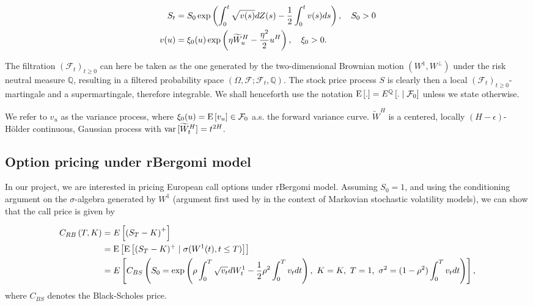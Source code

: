 \begin{align}\label{eq:rBergomi_model}
	S_t&= S_0  \operatorname{exp}\left( \int_{0}^{t} \sqrt{v(s)} dZ(s)- \frac{1}{2} \int_{0}^{t} v(s) ds   \right),\quad S_0>0 \nonumber\\
	v(u)&=\xi_0(u) \operatorname{exp}\left( \eta \widetilde{W}_u^H- \frac{\eta^2}{2} u^H \right), \quad \xi_0>0 .
\end{align}


The filtration $(\mathcal{F}_t)_{t\ge 0}$ can here be taken as the one generated by the two-dimensional Brownian motion $(W^1,W^\perp)$ under the risk neutral measure $\mathbb{Q}$, resulting in  a filtered probability space $(\Omega,\mathcal{F}; \mathcal{F}_t,\mathbb{Q})$. The stock price process $S$ is clearly then a local
$(\mathcal{F}_t)_{t\ge 0}$-martingale and a supermartingale, therefore integrable.  We shall henceforth use the notation $\mathrm{E}\left[.\right] = E^{\mathbb{Q}}\left[. \mid \mathcal{F}_0\right]$ unless we state otherwise.

We refer to $v_u$ as the variance process, where $\xi_0(u) = \mathrm{E}\left[v_u\right] \in \mathcal{F}_0$ a.s. the forward variance curve. $\widetilde{W}^H $ is a centered, locally $(H-\epsilon)$- H\"older continuous, Gaussian process with $\operatorname{var}{[\widetilde{W}^H_t]} = t^{2H}$.






\subsection{Option pricing under rBergomi model}\label{sec:Option pricing under rBergomi model}

In our project, we are interested in pricing European call options under rBergomi model. Assuming $S_0 = 1$, and using the conditioning argument on the $\sigma$-algebra generated by $W^1$ (argument first used by \cite{romano1997contingent} in the context of Markovian stochastic volatility  models), we can  show that the call price is given by

\begin{align}\label{BS_formula_rbergomi}
	C_{RB}\left( T, K \right) &= E\left[ \left(S_T - K \right)^+ \right]  \nonumber\\
	&=\mathrm{E}\left[\mathrm{E}\left[(S_T-K)^+ \mid \sigma(W^1(t) ,t \le T)\right]\right]\nonumber \\
	&=E\left[C_{BS}\left( S_0 = \operatorname{exp}\left(\rho \int_0^T \sqrt{v_t} dW_t^1 - \frac{1}{2}
	\rho^2 \int_0^T v_t dt\right),\ K = K, \ T = 1, \ \sigma^2 = (1-\rho^2)
	\int_0^T v_t dt \right) \right],
\end{align}
where $C_{BS}$ denotes the Black-Scholes price.

